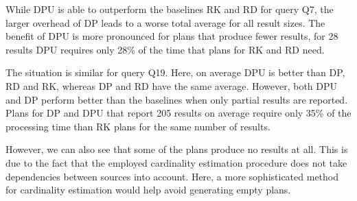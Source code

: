 While DPU is able to outperform the baselines RK and RD for query Q7,
the larger overhead of DP leads to a worse total average for all
result sizes. The benefit of DPU is more pronounced for plans that
produce fewer results, for 28 results DPU requires only 28\% of the
time that plans for RK and RD need.

The situation is similar for query Q19. Here, on average DPU is better
than DP, RD and RK, whereas DP and RD have the same average. However,
both DPU and DP perform better than the baselines when only partial
results are reported. Plans for DP and DPU that report 205 results on
average require only 35\% of the processing time than RK plans for the
same number of results.




However, we can also see that some of the plans produce no results at
all. This is due to the fact that the employed cardinality estimation
procedure does not take dependencies between sources into
account. Here, a more sophisticated method for cardinality estimation
would help avoid generating empty plans.

